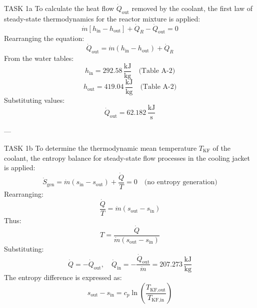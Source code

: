 TASK 1a  
To calculate the heat flow \( \dot{Q}_{\text{out}} \) removed by the coolant, the first law of steady-state thermodynamics for the reactor mixture is applied:  
\[
\dot{m} \left[ h_{\text{in}} - h_{\text{out}} \right] + \dot{Q}_R - \dot{Q}_{\text{out}} = 0
\]  
Rearranging the equation:  
\[
\dot{Q}_{\text{out}} = \dot{m} \left( h_{\text{in}} - h_{\text{out}} \right) + \dot{Q}_R
\]  
From the water tables:  
\[
h_{\text{in}} = 292.58 \, \frac{\text{kJ}}{\text{kg}} \quad \text{(Table A-2)}
\]  
\[
h_{\text{out}} = 419.04 \, \frac{\text{kJ}}{\text{kg}} \quad \text{(Table A-2)}
\]  
Substituting values:  
\[
\dot{Q}_{\text{out}} = 62.182 \, \frac{\text{kJ}}{\text{s}}
\]  

---

TASK 1b  
To determine the thermodynamic mean temperature \( T_{\text{KF}} \) of the coolant, the entropy balance for steady-state flow processes in the cooling jacket is applied:  
\[
\dot{S}_{\text{gen}} = \dot{m} \left( s_{\text{in}} - s_{\text{out}} \right) + \frac{\dot{Q}}{T} = 0 \quad \text{(no entropy generation)}
\]  
Rearranging:  
\[
\frac{\dot{Q}}{T} = \dot{m} \left( s_{\text{out}} - s_{\text{in}} \right)
\]  
Thus:  
\[
T = \frac{\dot{Q}}{\dot{m} \left( s_{\text{out}} - s_{\text{in}} \right)}
\]  
Substituting:  
\[
\dot{Q} = -\dot{Q}_{\text{out}}, \quad \dot{Q}_{\text{in}} = -\frac{\dot{Q}_{\text{out}}}{\dot{m}} = 207.273 \, \frac{\text{kJ}}{\text{kg}}
\]  
The entropy difference is expressed as:  
\[
s_{\text{out}} - s_{\text{in}} = c_p \ln \left( \frac{T_{\text{KF,out}}}{T_{\text{KF,in}}} \right)
\]